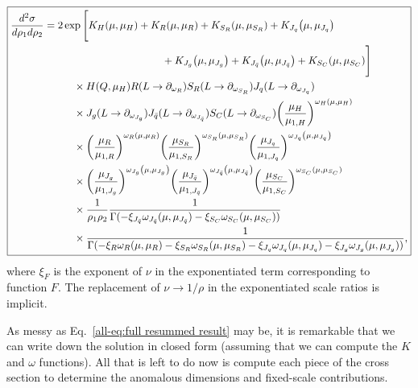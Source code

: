 \documentclass[../thesis.tex]{subfiles}
\begin{document}
	\begin{equation}\label{all-eq:full resummed result}
	\boxed{
	\begin{aligned}
		\frac{d^2\sigma}{d\rho_1 d\rho_2} &= 2 \exp\Bigg[K_H(\mu, \mu_H)  + K_R(\mu, \mu_R) + K_{S_R}(\mu, \mu_{S_R}) + K_{J_q}\qty(\mu, \mu_{J_q})  \\
		&\hspace{4cm}+ K_{J_g}\qty(\mu, \mu_{J_g}) + K_{J_{\bar q}}\qty(\mu, \mu_{J_{\bar q}}) + K_{S_C}(\mu, \mu_{S_C})  \Bigg] \\
		&\hspace{1cm}\times H(Q, \mu_H) R(L \to \partial_{\omega_R}) S_R(L \to \partial_{\omega_{S_R}}) J_q(L \to \partial_{\omega_{J_q}}) \\
		&\hspace{1cm}\times J_g(L \to \partial_{\omega_{J_g}}) J_{\bar q}(L \to \partial_{\omega_{J_{\bar q}}}) S_C(L \to \partial_{\omega_{S_C}}) \qty(\frac{\mu_H}{\mu_{1, H}})^{\omega_H(\mu, \mu_H)} \\
		&\hspace{1cm}\times  \qty(\frac{\mu_R}{\mu_{1, R}})^{\omega_R(\mu, \mu_R)} \qty(\frac{\mu_{S_R}}{\mu_{1, {S_R}}})^{\omega_{S_R}(\mu, \mu_{S_R})} \qty(\frac{\mu_{J_q}}{\mu_{1, J_q}})^{\omega_{J_q}\qty(\mu, \mu_{J_q})} \\
		&\hspace{1cm}\times \qty(\frac{\mu_{J_g}}{\mu_{1, J_g}})^{\omega_{J_g}\qty(\mu, \mu_{J_g})} \qty(\frac{\mu_{J_{\bar q}}}{\mu_{1, J_{\bar q}}})^{\omega_{J_{\bar q}}\qty(\mu, \mu_{J_{\bar q}})} \qty(\frac{\mu_{S_C}}{\mu_{1, S_C}})^{\omega_{S_C}(\mu, \mu_{S_C})} \\
		&\hspace{1cm}\times \frac{1}{\rho_1 \rho_2} \frac{1}{\Gamma(-\xi_{J_{\bar q}} \omega_{J_{\bar q}}(\mu, \mu_{J_{\bar q}}) - \xi_{S_C} \omega_{S_C}(\mu, \mu_{S_C}))}   \\
		&\hspace{1cm}\times \frac{1}{\Gamma(-\xi_R \omega_R(\mu, \mu_R) - \xi_{S_R} \omega_{S_R}(\mu, \mu_{S_R}) - \xi_{J_q} \omega_{J_q}(\mu, \mu_{J_q}) - \xi_{J_g} \omega_{J_g}(\mu, \mu_{J_g}))},
	\end{aligned}
	}
	\end{equation}
	where $\xi_F$ is the exponent of $\nu$ in the exponentiated term corresponding to function $F$. The replacement of $\nu \to 1/\rho$ in the exponentiated scale ratios is implicit.
	
	As messy as Eq.~\ref{all-eq:full resummed result} may be, it is remarkable that we can write down the solution in closed form (assuming that we can compute the $K$ and $\omega$ functions). All that is left to do now is compute each piece of the cross section to determine the anomalous dimensions and fixed-scale contributions.
\end{document}
